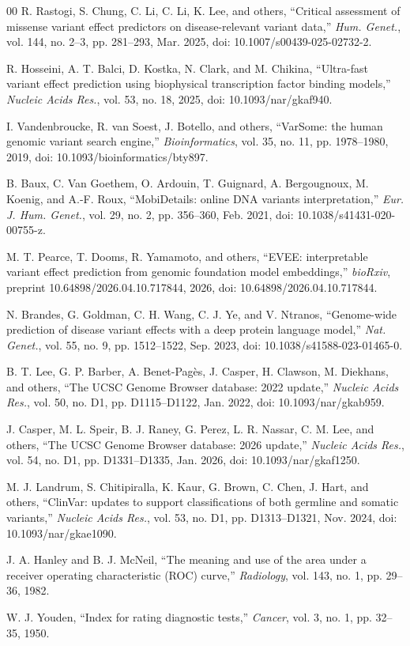 \documentclass[10pt,journal]{IEEEtran}
\begin{document}
\begin{thebibliography}{00}
 R. Rastogi, S. Chung, C. Li, C. Li, K. Lee, and others, ``Critical assessment of missense variant effect predictors on disease-relevant variant data,'' \textit{Hum. Genet.}, vol. 144, no. 2--3, pp. 281--293, Mar. 2025, doi: 10.1007/s00439-025-02732-2.

 R. Hosseini, A. T. Balci, D. Kostka, N. Clark, and M. Chikina, ``Ultra-fast variant effect prediction using biophysical transcription factor binding models,'' \textit{Nucleic Acids Res.}, vol. 53, no. 18, 2025, doi: 10.1093/nar/gkaf940.

 I. Vandenbroucke, R. van Soest, J. Botello, and others, ``VarSome: the human genomic variant search engine,'' \textit{Bioinformatics}, vol. 35, no. 11, pp. 1978--1980, 2019, doi: 10.1093/bioinformatics/bty897.

 B. Baux, C. Van Goethem, O. Ardouin, T. Guignard, A. Bergougnoux, M. Koenig, and A.-F. Roux, ``MobiDetails: online DNA variants interpretation,'' \textit{Eur. J. Hum. Genet.}, vol. 29, no. 2, pp. 356--360, Feb. 2021, doi: 10.1038/s41431-020-00755-z.

 M. T. Pearce, T. Dooms, R. Yamamoto, and others, ``EVEE: interpretable variant effect prediction from genomic foundation model embeddings,'' \textit{bioRxiv}, preprint 10.64898/2026.04.10.717844, 2026, doi: 10.64898/2026.04.10.717844.

 N. Brandes, G. Goldman, C. H. Wang, C. J. Ye, and V. Ntranos, ``Genome-wide prediction of disease variant effects with a deep protein language model,'' \textit{Nat. Genet.}, vol. 55, no. 9, pp. 1512--1522, Sep. 2023, doi: 10.1038/s41588-023-01465-0.

 B. T. Lee, G. P. Barber, A. Benet-Pag\`es, J. Casper, H. Clawson, M. Diekhans, and others, ``The UCSC Genome Browser database: 2022 update,'' \textit{Nucleic Acids Res.}, vol. 50, no. D1, pp. D1115--D1122, Jan. 2022, doi: 10.1093/nar/gkab959.

 J. Casper, M. L. Speir, B. J. Raney, G. Perez, L. R. Nassar, C. M. Lee, and others, ``The UCSC Genome Browser database: 2026 update,'' \textit{Nucleic Acids Res.}, vol. 54, no. D1, pp. D1331--D1335, Jan. 2026, doi: 10.1093/nar/gkaf1250.

 M. J. Landrum, S. Chitipiralla, K. Kaur, G. Brown, C. Chen, J. Hart, and others, ``ClinVar: updates to support classifications of both germline and somatic variants,'' \textit{Nucleic Acids Res.}, vol. 53, no. D1, pp. D1313--D1321, Nov. 2024, doi: 10.1093/nar/gkae1090.

 J. A. Hanley and B. J. McNeil, ``The meaning and use of the area under a receiver operating characteristic (ROC) curve,'' \textit{Radiology}, vol. 143, no. 1, pp. 29--36, 1982.

 W. J. Youden, ``Index for rating diagnostic tests,'' \textit{Cancer}, vol. 3, no. 1, pp. 32--35, 1950.

\end{thebibliography}
\end{document}
